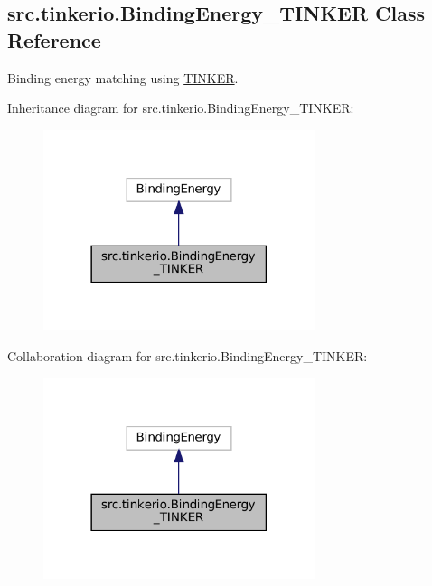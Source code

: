 \hypertarget{classsrc_1_1tinkerio_1_1BindingEnergy__TINKER}{}\subsection{src.\+tinkerio.\+Binding\+Energy\+\_\+\+T\+I\+N\+K\+ER Class Reference}
\label{classsrc_1_1tinkerio_1_1BindingEnergy__TINKER}


Binding energy matching using \hyperlink{classsrc_1_1tinkerio_1_1TINKER}{T\+I\+N\+K\+ER}.  




Inheritance diagram for src.\+tinkerio.\+Binding\+Energy\+\_\+\+T\+I\+N\+K\+ER\+:
\nopagebreak
\begin{figure}[H]
\begin{center}
\leavevmode
\includegraphics[width=225pt]{classsrc_1_1tinkerio_1_1BindingEnergy__TINKER__inherit__graph}
\end{center}
\end{figure}


Collaboration diagram for src.\+tinkerio.\+Binding\+Energy\+\_\+\+T\+I\+N\+K\+ER\+:
\nopagebreak
\begin{figure}[H]
\begin{center}
\leavevmode
\includegraphics[width=225pt]{classsrc_1_1tinkerio_1_1BindingEnergy__TINKER__coll__graph}
\end{center}
\end{figure}
